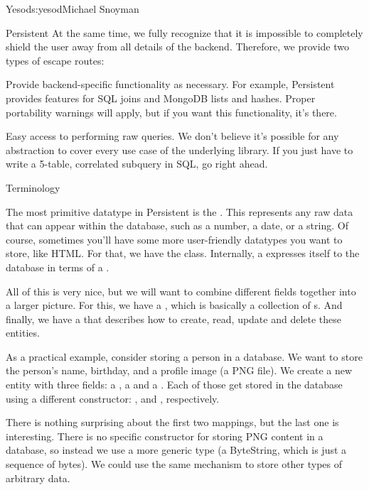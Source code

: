 \begin{aosachapter}{Yesod}{s:yesod}{Michael Snoyman}
\begin{aosasect1}{Persistent}
At the same time, we fully recognize that it is impossible to
completely shield the user away from all details of the
backend. Therefore, we provide two types of escape routes:

\begin{aosaitemize}

\item Provide backend-specific functionality as necessary. For
  example, Persistent provides features for SQL joins and MongoDB
  lists and hashes. Proper portability warnings will apply, but if you
  want this functionality, it's there.

\item Easy access to performing raw queries. We don't believe it's
  possible for any abstraction to cover every use case of the
  underlying library. If you just have to write a 5-table, correlated
  subquery in SQL, go right ahead.

\end{aosaitemize}

\begin{aosasect2}{Terminology}

The most primitive datatype in Persistent is the
. This represents any raw data that can appear
within the database, such as a number, a date, or a string. Of course,
sometimes you'll have some more user-friendly datatypes you want to
store, like HTML. For that, we have the 
class. Internally, a  expresses itself to the
database in terms of a .

All of this is very nice, but we will want to combine different fields
together into a larger picture. For this, we have a
, which is basically a collection of
s. And finally, we have a 
that describes how to create, read, update and delete these entities.

As a practical example, consider storing a person in a database. We
want to store the person's name, birthday, and a profile image (a PNG
file). We create a new entity  with three fields: a
, a  and a . Each of those get stored
in the database using a different  constructor:
,  and ,
respectively.

There is nothing surprising about the first two mappings, but the last
one is interesting. There is no specific constructor for storing PNG
content in a database, so instead we use a more generic type (a
ByteString, which is just a sequence of bytes). We could use the same
mechanism to store other types of arbitrary data.


\end{aosasect2}
\end{aosasect1}
\end{aosachapter}
